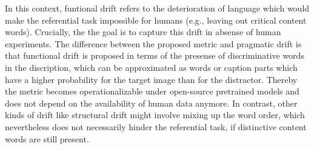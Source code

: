 In this context, funtional drift refers to the deterioration of language which would make the referential task impossible for humans (e.g., leaving out critical content words). Crucially, the the goal is to capture this drift in absense of human experiments. The difference between the proposed metric and pragmatic drift is that functional drift is proposed in terms of the presense of discriminative words in the discription, which can be approximated as words or caption parts which have a higher probability for the target image than for the distractor. Thereby the metric becomes operationalizable under open-source pretrained models and does not depend on the availability of human data anymore. 
In contrast, other kinds of drift like structural drift might involve mixing up the word order, which nevertheless does not necessarily hinder the referential task, if distinctive content words are still present.  

